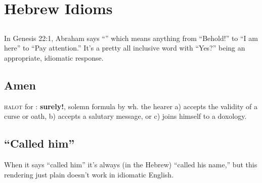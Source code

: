\section{Hebrew Idioms}\label{app:idioms}\thispagestyle{fancy}
\subsection{}
In Genesis 22:1, Abraham says ``'' which means anything from ``Behold!'' to ``I am here'' to ``Pay attention.'' It's a pretty all inclusive word with ``Yes?'' being an appropriate, idiomatic response.

\subsection{Amen}
\textsc{halot} for : \textbf{surely!}, solemn formula by wh\@. the hearer a) accepts the validity of a curse or oath, b) accepts a salutary message, or c) joins himself to a doxology.

\subsection{``Called him''}
When it says ``called him'' it's always (in the Hebrew) ``called his name,'' but this rendering just plain doesn't work in idiomatic English.
